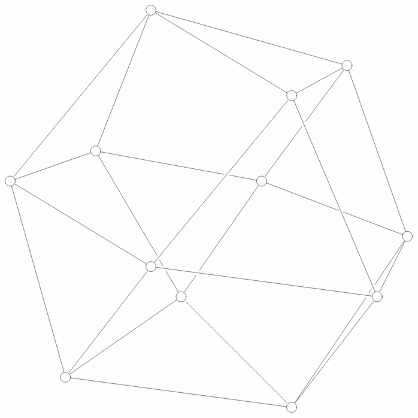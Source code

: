 \documentclass[12pt]{article}
\begin{document}
$$ \xymatrix{
    & & & & & *++[Fo]{}\ar@{-}[ddrrrrrrr] \ar@{-}[dddrrrrr] \ar@{-}[dddddll] \ar@{-}[ddddddlllll] & & & & & & & & & \\
    \\
    & & & & & & & & & & & & *++[Fo]{} \ar@{-}[dll] \ar@{-}[ddddddrr] \ar@{-}[ddddlll]|!{[dll];[ddddddddr]}\hole & & \\
    & & & & & & & & & & *++[Fo]{} \ar@{-}[dddddddrrr] \ar@{-}[ddddddlllll] & & & & \\
    \\
    & & & *++[Fo]{} \ar@{-}[dlll] \ar@{-}[drrrrrr]|!{[uurrrrrrr];[ddddrr]}\hole \ar@{-}[dddddrrr]|!{[uurrrrrrr];[ddddrr]}\hole|!{[ddddrr];[dddddrrrrrrrrrr]}\hole & & & & & & & & & & & \\
    *++[Fo]{} \ar@{-}[dddrrrrr] \ar@{-}[dddddddrr] & & & & & & & & & *++[Fo]{} \ar@{-}[ddrrrrr]|!{[uuur];[ddddrrrr]}\hole \ar@{-}[ddddlll]|!{[dddllll];[ddddrrrr]}\hole & & & & & \\
    \\
    & & & & & & & & & & & & & & *++[Fo]{} \ar@{-}[ddl] \ar@{-}[ddddddllll]|!{[uuuuullll];[ddl]}\hole|!{[dlllllllll];[ddl]}\hole \\
    & & & & & *++[Fo]{} \ar@{-}[drrrrrrrr] \ar@{-}[ddddlll] & & & & & & & & & \\
    & & & & & & *++[Fo]{} \ar@{-}[dddllll] \ar@{-}[ddddrrrr] & & & & & & & *++[Fo]{} \ar@{-}[ddddlll] & \\
    \\
    \\
    & & *++[Fo]{} \ar@{-}[drrrrrrrr] & & & & & & & & & & & & \\
    & & & & & & & & & & *++[Fo]{} & & & & \\} $$
\end{document}
